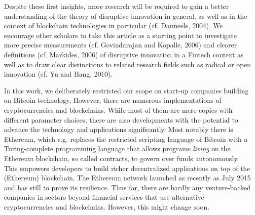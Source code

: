 Despite these first insights, more research will be required to gain a better understanding 
of the theory of disruptive innovation in general, as well as in the context of 
blockchain technologies in particular (cf. Danneels, 2004). We encourage other 
scholars to take this article as a starting point to investigate more precise measurements 
(cf. Govindarajan and Kopalle, 2006) and clearer definitions (cf. Markides, 2006) 
of disruptive innovation in a Fintech context as well as to draw clear distinctions 
to related research fields such as radical or open innovation (cf. Yu and Hang, 
2010). 

In this work, we deliberately restricted our scope on start-up companies building 
on Bitcoin technology. However, there are numerous implementations of cryptocurrencies 
and blockchains. While most of them are mere copies with different parameter choices, 
there are also developments with the potential to advance the technology and applications 
significantly. Most notably there is Ethereum, which e.g. replaces the restricted 
scripting language of Bitcoin with a Turing-complete programming language that 
allows programs \emph{living} on the Ethereum blockchain, so called contracts, to 
govern over funds autonomously. This empowers developers to build richer decentralized 
applications on top of the (Ethereum) blockchain. The Ethereum network launched 
as recently as July 2015 and has still to prove its resilience. Thus far, there 
are hardly any venture-backed companies in sectors beyond financial services that 
use alternative cryptocurrencies and blockchains. However, this might change soon.